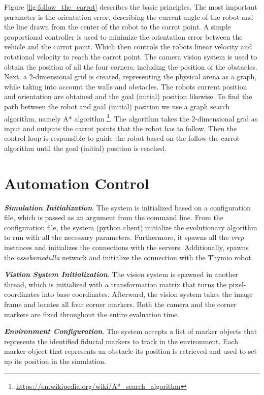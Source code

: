 Figure \ref{fig:follow_the_carrot} describes the basic principles. The most important parameter is the orientation error, describing the current angle of the robot and the line drawn from the center of the robot to the carrot point. A simple proportional controller is used to minimize the orientation error between the vehicle and the carrot point. Which then controls the robots linear velocity and rotational velocity to reach the carrot point. The camera vision system is used to obtain the position of all the four corners, including the position of the obstacles. Next, a 2-dimensional grid is created, representing the physical arena as a graph, while taking into account the walls and obstacles. The robots current position and orientation are obtained and the goal (initial) position likewise. To find the path between the robot and goal (initial) position we use a graph search algorithm, namely A* algorithm \footnote{\url{https://en.wikipedia.org/wiki/A*_search_algorithm}}. The algorithm takes the 2-dimensional grid as input and outputs the carrot points that the robot has to follow. Then the control loop is responsible to guide the robot based on the follow-the-carrot algorithm until the goal (initial) position is reached.

\section{Automation Control}

\textbf{\emph{Simulation Initialization}}. The system is initialized based on a configuration file, which is passed as an argument from the command line. From the configuration file, the system (python client) initialize the evolutionary algorithm to run with all the necessary parameters. Furthermore, it spawns all the \emph{vrep} instances and initializes the connections with the servers. Additionally, spawns the \emph{assebamedulla} network and initialize the connection with the Thymio robot.

\textbf{\emph{Vistion System Initialization}}. The vision system is spawned in another thread, which is initialized with a transformation matrix that turns the pixel-coordinates into base coordinates. Afterward, the vision system takes the image frame and locates all four corner markers. Both the camera and the corner markers are fixed throughout the entire evaluation time.

\textbf{\emph{Environment Configuration}}. The system accepts a list of marker objects that represents the identified fiducial markers to track in the environment. Each marker object that represents an obstacle its position is retrieved and used to set up its position in the simulation.

